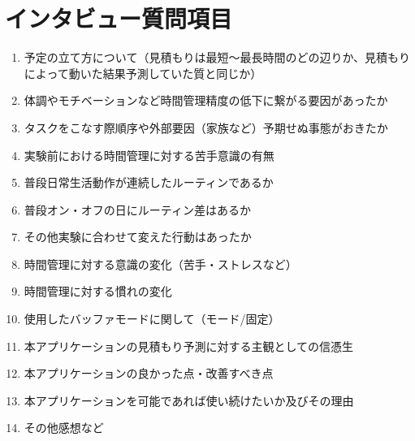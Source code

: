 \chapter{インタビュー質問項目}
  \begin{enumerate}
  \item 予定の立て方について（見積もりは最短〜最長時間のどの辺りか、見積もりによって動いた結果予測していた質と同じか）
  \item 体調やモチベーションなど時間管理精度の低下に繋がる要因があったか
  \item タスクをこなす際順序や外部要因（家族など）予期せぬ事態がおきたか
  \item 実験前における時間管理に対する苦手意識の有無
  \item 普段日常生活動作が連続したルーティンであるか
  \item 普段オン・オフの日にルーティン差はあるか
 \item その他実験に合わせて変えた行動はあったか
  \item 時間管理に対する意識の変化（苦手・ストレスなど）
  \item 時間管理に対する慣れの変化 
 \item 使用したバッファモードに関して（モード/固定）
  \item 本アプリケーションの見積もり予測に対する主観としての信憑生
  \item 本アプリケーションの良かった点・改善すべき点
  \item 本アプリケーションを可能であれば使い続けたいか及びその理由
  \item その他感想など
\end{enumerate}